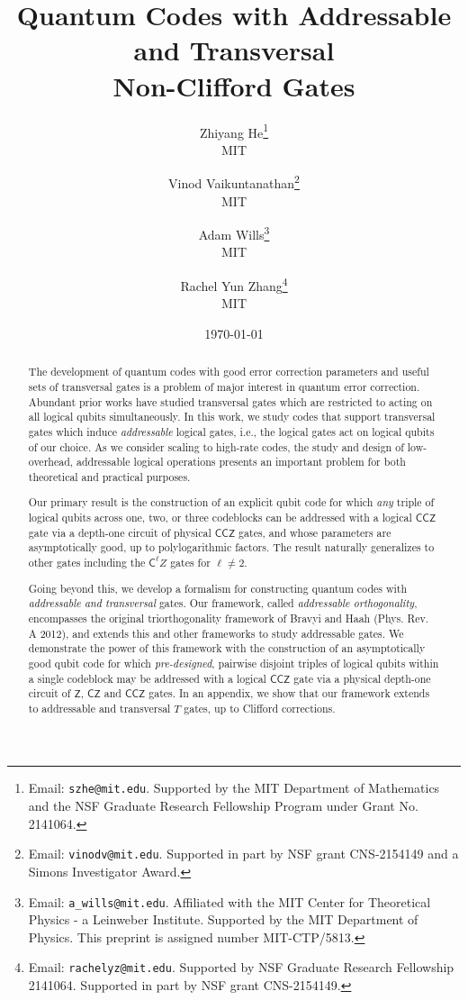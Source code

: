 \documentclass[11pt]{article}
\title{Quantum Codes with Addressable and Transversal \\ Non-Clifford Gates}
\author{Zhiyang He\thanks{Email: \texttt{szhe@mit.edu}. Supported by the MIT Department of Mathematics and the NSF Graduate Research Fellowship Program under Grant No. 2141064.}\\MIT
\and Vinod Vaikuntanathan\thanks{Email: \texttt{vinodv@mit.edu}. Supported in part by NSF grant CNS-2154149 and a Simons Investigator Award.}\\MIT
\and Adam Wills\thanks{Email: \texttt{a\_wills@mit.edu}. Affiliated with the MIT Center for Theoretical Physics - a Leinweber Institute. Supported by the MIT Department of Physics. This preprint is assigned number MIT-CTP/5813.}\\MIT
\and Rachel Yun Zhang\thanks{Email: \texttt{rachelyz@mit.edu}. Supported by NSF Graduate Research Fellowship 2141064. Supported in part by NSF grant CNS-2154149.}\\MIT}
\date{\today}
\theoremstyle{definition}
\newcommand{\CCZ}{\mathsf{CCZ}}
\begin{document}
\sloppy
\maketitle
\renewcommand{\thefootnote}{\fnsymbol{footnote}}
\setcounter{footnote}{5}
\setcounter{footnote}{0}
\renewcommand{\thefootnote}{\arabic{footnote}}

\begin{abstract}

The development of quantum codes with good error correction parameters and useful sets of transversal gates is a problem of major interest in quantum error correction. Abundant prior works have studied transversal gates which are restricted to acting on all logical qubits simultaneously.
In this work, we study codes that support transversal gates which induce \textit{addressable} logical gates, i.e., the logical gates act on logical qubits of our choice.
As we consider scaling to high-rate codes, the study and design of low-overhead, addressable logical operations presents an important problem for both theoretical and practical purposes.

Our primary result is the construction of an explicit qubit code for which \textit{any} triple of logical qubits across one, two, or three codeblocks can be addressed with a logical $\CCZ$ gate via a depth-one circuit of physical $\CCZ$ gates, and whose parameters are asymptotically good, up to polylogarithmic factors. The result naturally generalizes to other gates including the $\mathsf{C}^{\ell} Z$ gates for $\ell \neq 2$.

Going beyond this, we develop a formalism for constructing quantum codes with {\em addressable and transversal} gates.
Our framework, called \textit{addressable orthogonality}, encompasses the original triorthogonality framework of Bravyi and Haah (Phys. Rev. A 2012), and extends this and other frameworks to study addressable gates.
We demonstrate the power of this framework with the construction of an asymptotically good qubit code for which {\em pre-designed}, pairwise disjoint triples of logical qubits within a single codeblock may be addressed with a logical $\CCZ$ gate via a physical depth-one circuit of $\mathsf{Z}$, $\mathsf{CZ}$ and $\CCZ$ gates. 
In an appendix, we show that our framework extends to addressable and transversal $T$ gates, up to Clifford corrections.






\end{abstract}
\thispagestyle{empty}
\newpage
\end{document}
